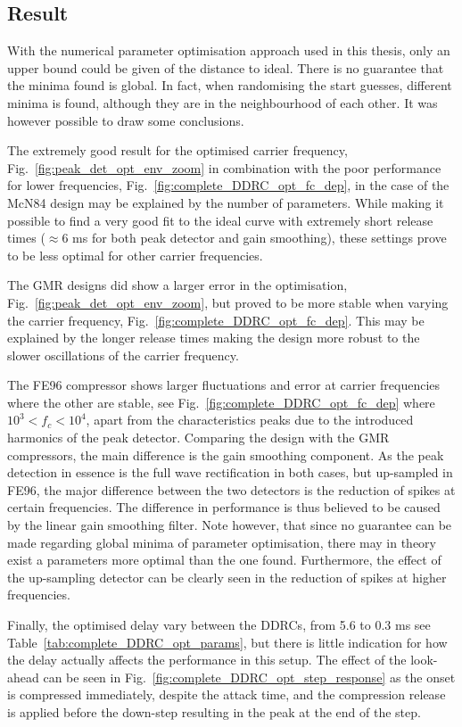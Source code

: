\documentclass[../main2.tex]{subfiles}
\begin{document}
\subsection{Result}\label{discussion_results}
With the numerical parameter optimisation approach used in this thesis, only an upper bound could be given of the distance to ideal. There is no guarantee that the minima found is global. In fact, when randomising the start guesses, different minima is found, although they are in the neighbourhood of each other. It was however possible to draw some conclusions.

The extremely good result for the optimised carrier frequency, Fig.~\ref{fig:peak_det_opt_env_zoom} in combination with the poor performance for lower frequencies, Fig.~\ref{fig:complete_DDRC_opt_fc_dep}, in the case of the McN84 design may be explained by the number of parameters. While making it possible to find a very good fit to the ideal curve with extremely short release times ($\approx 6$ ms for both peak detector and gain smoothing), these settings prove to be less optimal for other carrier frequencies.  

The GMR designs did show a larger error in the optimisation, Fig.~\ref{fig:peak_det_opt_env_zoom}, but proved to be more stable when varying the carrier frequency, Fig.~\ref{fig:complete_DDRC_opt_fc_dep}. This may be explained by the longer release times making the design more robust to the slower oscillations of the carrier frequency. 

The FE96 compressor shows larger fluctuations and error at carrier frequencies where the other are stable, see Fig.~\ref{fig:complete_DDRC_opt_fc_dep} where $10^3<f_c<10^4$, apart from the characteristics peaks due to the introduced harmonics of the peak detector. Comparing the design with the GMR compressors, the main difference is the gain smoothing component. As the peak detection in essence is the full wave rectification in both cases, but up-sampled in FE96, the major difference between the two detectors is the reduction of spikes at certain frequencies. The difference in performance is thus believed to be caused by the linear gain smoothing filter. Note however, that since no guarantee can be made regarding global minima of parameter optimisation, there may in theory exist a parameters more optimal than the one found. Furthermore, the effect of the up-sampling detector can be clearly seen in the reduction of spikes at higher frequencies.

Finally, the optimised delay vary between the DDRCs, from 5.6 to 0.3 ms see Table~\ref{tab:complete_DDRC_opt_params}, but there is little indication for how the delay actually affects the performance in this setup. The effect of the look-ahead can be seen in Fig.~\ref{fig:complete_DDRC_opt_step_response} as the onset is compressed immediately, despite the attack time, and the compression release is applied before the down-step resulting in the peak at the end of the step.
\end{document}
